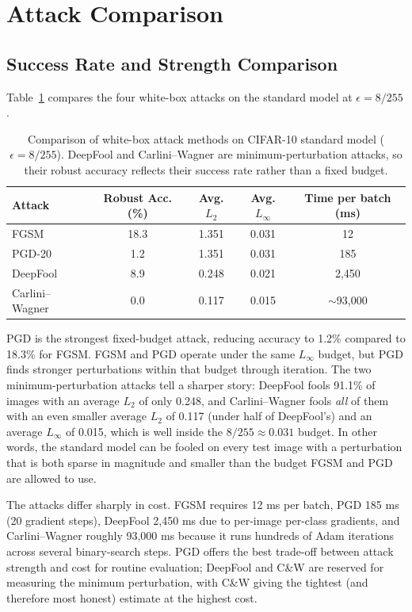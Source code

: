 \section{Attack Comparison}

\subsection{Success Rate and Strength Comparison}

Table~\ref{tab:attack_comparison} compares the four white-box attacks on the standard model at $\epsilon = 8/255$.

\begin{table}[htbp]
    \centering
    \caption{Comparison of white-box attack methods on CIFAR-10 standard model ($\epsilon = 8/255$). DeepFool and Carlini--Wagner are minimum-perturbation attacks, so their robust accuracy reflects their success rate rather than a fixed budget.}
    \label{tab:attack_comparison}
    \begin{tabular}{lcccc}
        \toprule
        \textbf{Attack} & \textbf{Robust Acc. (\%)} & \textbf{Avg. $L_2$} & \textbf{Avg. $L_\infty$} & \textbf{Time per batch (ms)} \\
        \midrule
        FGSM & 18.3 & 1.351 & 0.031 & 12 \\
        PGD-20 & 1.2 & 1.351 & 0.031 & 185 \\
        DeepFool & 8.9 & 0.248 & 0.021 & 2,450 \\
        Carlini--Wagner & 0.0 & 0.117 & 0.015 & $\sim$93,000 \\
        \bottomrule
    \end{tabular}
\end{table}

PGD is the strongest fixed-budget attack, reducing accuracy to 1.2\% compared to 18.3\% for FGSM. FGSM and PGD operate under the same $L_\infty$ budget, but PGD finds stronger perturbations within that budget through iteration. The two minimum-perturbation attacks tell a sharper story: DeepFool fools 91.1\% of images with an average $L_2$ of only 0.248, and Carlini--Wagner fools \emph{all} of them with an even smaller average $L_2$ of 0.117 (under half of DeepFool's) and an average $L_\infty$ of 0.015, which is well inside the $8/255 \approx 0.031$ budget. In other words, the standard model can be fooled on every test image with a perturbation that is both sparse in magnitude and smaller than the budget FGSM and PGD are allowed to use.

The attacks differ sharply in cost. FGSM requires 12 ms per batch, PGD 185 ms (20 gradient steps), DeepFool 2{,}450 ms due to per-image per-class gradients, and Carlini--Wagner roughly 93{,}000 ms because it runs hundreds of Adam iterations across several binary-search steps. PGD offers the best trade-off between attack strength and cost for routine evaluation; DeepFool and C\&W are reserved for measuring the minimum perturbation, with C\&W giving the tightest (and therefore most honest) estimate at the highest cost.

